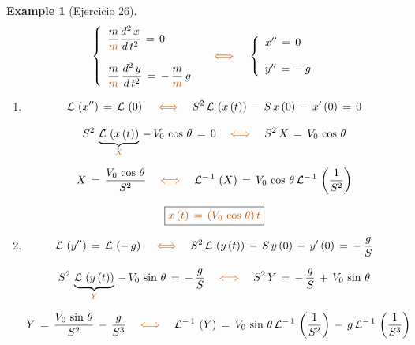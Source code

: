 \documentclass[a4paper,11pt,openany]{book}
\newtheorem{exmp}{Example}[section]
\newcommand*{\itembolasazules}[1]{%
\footnotesize\protect\tikz[baseline=-3pt]%
\protect\node[scale=.7, circle, shade, ball
color=green]{\color{white}\Large\bf#1};}
\begin{document}
\begin{exmp}[Ejercicio 26]
 
 
$$\left\{
\begin{array}{ll}
\dfrac{m}{\textcolor{burntorange}{m}} \dfrac{d^{2}\,x}{d\,t^{2}}\,=\,0 \\ \\
\dfrac{m}{\textcolor{burntorange}{m}}\,\dfrac{d^{2}\,y}{d\,t^{2}}\,=\,-\,\dfrac{m}{\textcolor{burntorange}{m}}\,g
\end{array}
\right. \quad \textcolor{burntorange}{\iff} \quad \left\{
\begin{array}{ll}
x''\,=\,0 \\ \\
y''\,=\,-\,g
\end{array}
\right. $$
 
\begin{enumerate}[label=\itembolasazules{\arabic*}]
 
\item $$\mathcal{L}\,\left(x'' \right)\,=\,\mathcal{L}\,\left(0 \right) \quad \textcolor{burntorange}{\iff} \quad S^{2}\,\mathcal{L}\,\left(x\,(t) \right)\,-\,S\,x\,(0)\,-\,x'\,(0)\,=\,0 $$
 
$$S^{2}\,\underbrace{\mathcal{L}\,\left(x\,(t) \right)}_{\textcolor{burntorange}{X} }\,-\,V_{0}\,\cos\,\theta\,=\,0 \quad \textcolor{burntorange}{\iff} \quad S^{2}\,X\,=\,V_{0}\,\cos\,\theta$$
 
$$X\,=\,\dfrac{V_{0}\,\cos\,\theta}{S^{2}} \quad \textcolor{burntorange}{\iff} \quad \mathcal{L}^{-\,1}\,\left(X \right)\,=\,V_{0}\,\cos\,\theta\,\mathcal{L}^{-\,1}\,\left(\dfrac{1}{S^{2}
} \right)$$
 
$$\boxed{\textcolor{burntorange}{x\,(t)\,=\,(V_{0}\,\cos\,\theta)\,t } } $$
 
\item $$\mathcal{L}\,\left(y'' \right)\,=\,\mathcal{L}\,\left(-\,g \right) \quad \textcolor{burntorange}{\iff} \quad S^{2}\,\mathcal{L}\,\left(y\,(t) \right)\,-\,S\,y\,(0)\,-\,y'\,(0)\,=\,-\,\dfrac{g}{S} $$
 
$$S^{2}\,\underbrace{\mathcal{L}\,\left(y\,(t) \right)}_{\textcolor{burntorange}{Y} }\,-\,V_{0}\,\sin\,\theta\,=\,-\,\dfrac{g}{S} \quad \textcolor{burntorange}{\iff} \quad S^{2}\,Y\,=\,-\,\dfrac{g}{S}\,+\,V_{0}\,\sin\,\theta$$
 
$$Y\,=\,\dfrac{V_{0}\,\sin\,\theta}{S^{2}}\,-\,\dfrac{g}{S^{3}} \quad \textcolor{burntorange}{\iff} \quad \mathcal{L}^{-\,1}\,\left(Y \right)\,=\,V_{0}\,\sin\,\theta\,\mathcal{L}^{-\,1}\,\left(\dfrac{1}{S^{2}} \right)\,-\,g\,\mathcal{L}^{-\,1}\,\left(\dfrac{1}{S^{3}} \right) $$
 

\end{enumerate}
\end{exmp}
\end{document}
